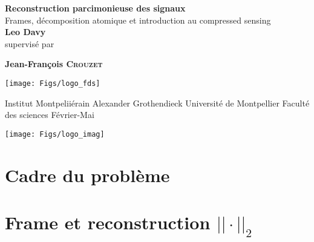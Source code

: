 \documentclass[french, 12pt]{report}
\theoremstyle{plain}
\theoremstyle{remark}
\theoremstyle{definition}
\begin{document}
\renewcommand{\proofname}{Preuve}
\begin{titlepage}
	\begin{center}
		\vspace*{1cm}
		\huge
		\textbf{Reconstruction parcimonieuse des signaux\\}
		\vspace*{0.5cm}
	        \LARGE
		Frames, décomposition atomique et introduction au compressed sensing\\ 
		\vspace{1.5cm}
		\textbf{Leo Davy}\\
		\vspace{1.5cm}			      
	        supervisé par\par
		\textbf{Jean-François \textsc{Crouzet}}

		\vfill
		\noindent
		\begin{minipage}[b]{0.2\textwidth}
			\hspace*{-1.5cm}
			\texttt{[image: Figs/logo\_fds]}	
		\end{minipage}%
		\begin{minipage}[b][2cm]{0.6\textwidth}
			\centering	
			\Large					  
			Institut Montpeliiérain Alexander Grothendieck\vfill 
			Université de Montpellier\vfill 
			Faculté des sciences\vfill 
			Février-Mai
		\end{minipage}%
		\begin{minipage}[b]{0.2\textwidth}
			\hspace*{0.5cm}
			\texttt{[image: Figs/logo\_imag]}
		\end{minipage}	
	\end{center}
\end{titlepage}


\tableofcontents{}

\chapter{Cadre du problème}


\chapter{Frame et reconstruction $||\cdot||_2$}

\end{document}
